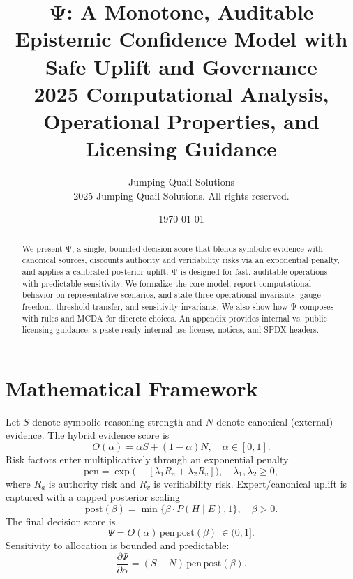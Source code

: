 \documentclass[12pt,a4paper]{article}
\title{Ψ: A Monotone, Auditable Epistemic Confidence Model with Safe Uplift and Governance\vspace{4pt}\\\large 2025 Computational Analysis, Operational Properties, and Licensing Guidance}
\author{Jumping Quail Solutions\\\small \textcopyright{} 2025 Jumping Quail Solutions. All rights reserved.}
\date{\today}
\begin{document}
\maketitle

\begin{abstract}
We present Ψ, a single, bounded decision score that blends symbolic evidence with canonical sources, discounts authority and verifiability risks via an exponential penalty, and applies a calibrated posterior uplift. Ψ is designed for fast, auditable operations with predictable sensitivity. We formalize the core model, report computational behavior on representative scenarios, and state three operational invariants: gauge freedom, threshold transfer, and sensitivity invariants. We also show how Ψ composes with rules and MCDA for discrete choices. An appendix provides internal vs. public licensing guidance, a paste-ready internal-use license, notices, and SPDX headers.
\end{abstract}

\section{Mathematical Framework}
Let $S$ denote symbolic reasoning strength and $N$ denote canonical (external) evidence. The hybrid evidence score is
\begin{equation}
O(\alpha) = \alpha S + (1-\alpha) N, \quad \alpha\in[0,1].
\end{equation}
Risk factors enter multiplicatively through an exponential penalty
\begin{equation}
\mathrm{pen} = \exp\big(-[\lambda_1 R_a + \lambda_2 R_v]\big), \quad \lambda_1,\lambda_2\ge 0,
\end{equation}
where $R_a$ is authority risk and $R_v$ is verifiability risk. Expert/canonical uplift is captured with a capped posterior scaling
\begin{equation}
\mathrm{post}(\beta) = \min\{\beta \cdot P(H\mid E), 1\}, \quad \beta>0.
\end{equation}
The final decision score is
\begin{equation}
\boxed{\Psi = O(\alpha)\, \mathrm{pen}\, \mathrm{post}(\beta)}\ \in (0,1].
\end{equation}
Sensitivity to allocation is bounded and predictable:
\begin{equation}
\frac{\partial \Psi}{\partial \alpha} = (S-N)\, \mathrm{pen}\, \mathrm{post}(\beta).
\end{equation}
\end{document}
